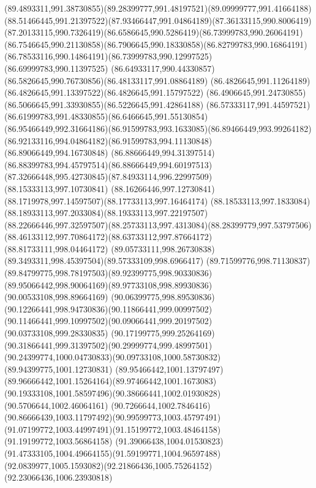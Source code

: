 {{  \curveto(89.4893311,991.38730855)(89.28399777,991.48197521)(89.09999777,991.41664188)
  \curveto(88.51466445,991.21397522)(87.93466447,991.04864189)(87.36133115,990.8006419)
  \curveto(87.20133115,990.7326419)(86.6586645,990.5286419)(86.73999783,990.26064191)
  \curveto(86.7546645,990.21130858)(86.7906645,990.18330858)(86.82799783,990.16864191)
  \curveto(86.78533116,990.14864191)(86.73999783,990.12997525)(86.69999783,990.11397525)
  \curveto(86.64933117,990.44330857)(86.5826645,990.76730856)(86.48133117,991.08864189)
  \curveto(86.4826645,991.11264189)(86.4826645,991.13397522)(86.4826645,991.15797522)
  \curveto(86.4906645,991.24730855)(86.5066645,991.33930855)(86.5226645,991.42864188)
  \curveto(86.57333117,991.44597521)(86.61999783,991.48330855)(86.6466645,991.55130854)
  \curveto(86.95466449,992.31664186)(86.91599783,993.1633085)(86.89466449,993.99264182)
  \curveto(86.92133116,994.04864182)(86.91599783,994.11130848)(86.89066449,994.16730848)
  \curveto(86.88666449,994.31397514)(86.88399783,994.45797514)(86.88666449,994.60197513)
  \curveto(87.32666448,995.42730845)(87.84933114,996.22997509)(88.15333113,997.10730841)
  \curveto(88.16266446,997.12730841)(88.1719978,997.14597507)(88.17733113,997.16464174)
  \curveto(88.18533113,997.1833084)(88.18933113,997.2033084)(88.19333113,997.22197507)
  \curveto(88.22666446,997.32597507)(88.25733113,997.4313084)(88.28399779,997.53797506)
  \curveto(88.46133112,997.70864172)(88.63733112,997.87664172)(88.81733111,998.04464172)
  \curveto(89.05733111,998.26730838)(89.3493311,998.45397504)(89.57333109,998.6966417)
  \curveto(89.71599776,998.71130837)(89.84799775,998.78197503)(89.92399775,998.90330836)
  \curveto(89.95066442,998.90064169)(89.97733108,998.89930836)(90.00533108,998.89664169)
  \curveto(90.06399775,998.89530836)(90.12266441,998.94730836)(90.11866441,999.00997502)
  \curveto(90.11466441,999.10997502)(90.09066441,999.20197502)(90.03733108,999.28330835)
  \curveto(90.17199775,999.25264169)(90.31866441,999.31397502)(90.29999774,999.48997501)
  \curveto(90.24399774,1000.04730833)(90.09733108,1000.58730832)(89.94399775,1001.12730831)
  \curveto(89.95466442,1001.13797497)(89.96666442,1001.15264164)(89.97466442,1001.1673083)
  \curveto(90.19333108,1001.58597496)(90.38666441,1002.01930828)(90.5706644,1002.46064161)
  \curveto(90.7266644,1002.7846416)(90.86666439,1003.11797492)(90.99599773,1003.45797491)
  \curveto(91.07199772,1003.44997491)(91.15199772,1003.48464158)(91.19199772,1003.56864158)
  \curveto(91.39066438,1004.01530823)(91.47333105,1004.49664155)(91.59199771,1004.96597488)
  \curveto(92.0839977,1005.1593082)(92.21866436,1005.75264152)(92.23066436,1006.23930818)
}}
